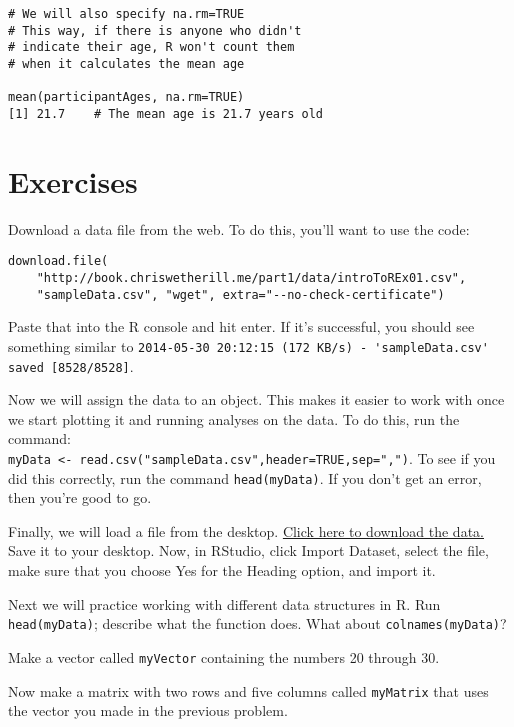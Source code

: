 \begin{framed}
\begin{Verbatim}[samepage=TRUE]
# We will also specify na.rm=TRUE
# This way, if there is anyone who didn't
# indicate their age, R won't count them
# when it calculates the mean age

mean(participantAges, na.rm=TRUE)
[1] 21.7    # The mean age is 21.7 years old
\end{Verbatim}
\end{framed}

\section{Exercises}
\prob Download a data file from the web. To do this, you'll want to use the code:
\begin{framed}
\begin{Verbatim}[samepage=TRUE]
download.file(
    "http://book.chriswetherill.me/part1/data/introToREx01.csv",
    "sampleData.csv", "wget", extra="--no-check-certificate")
\end{Verbatim}
\end{framed}
Paste that into the R console and hit enter. If it's successful, you should see something similar to \verb|2014-05-30 20:12:15 (172 KB/s) - 'sampleData.csv' saved [8528/8528]|.

\prob Now we will assign the data to an object. This makes it easier to work with once we start plotting it and running analyses on the data. To do this, run the command: \\\verb|myData <- read.csv("sampleData.csv",header=TRUE,sep=",")|. To see if you did this correctly, run the command \verb|head(myData)|. If you don't get an error, then you're good to go.

\prob Finally, we will load a file from the desktop. \href{https://raw.githubusercontent.com/faulconbridge/appliedStats/master/part1/data/introToREx01.csv}{Click here to download the data.} Save it to your desktop. Now, in RStudio, click Import Dataset, select the file, make sure that you choose Yes for the Heading option, and import it.

\prob Next we will practice working with different data structures in R. Run \verb|head(myData)|; describe what the function does. What about \verb|colnames(myData)|?

\prob Make a vector called \verb|myVector| containing the numbers 20 through 30.

\prob Now make a matrix with two rows and five columns called \verb|myMatrix| that uses the vector you made in the previous problem.

